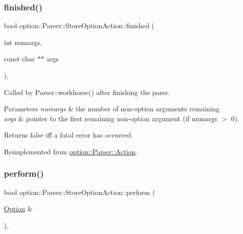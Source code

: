 \subsubsection{\texorpdfstring{finished()}{finished()}}
{\footnotesize\ttfamily bool option\+::\+Parser\+::\+Store\+Option\+Action\+::finished (\begin{DoxyParamCaption}\item[{int}]{numargs,  }\item[{const char $\ast$$\ast$}]{args }\end{DoxyParamCaption})\hspace{0.3cm}{\ttfamily [inline]}, {\ttfamily [virtual]}}



Called by Parser\+::workhorse() after finishing the parse. 


\begin{DoxyParams}{Parameters}
{\em numargs} & the number of non-\/option arguments remaining \\
\hline
{\em args} & pointer to the first remaining non-\/option argument (if numargs $>$ 0).\\
\hline
\end{DoxyParams}
\begin{DoxyReturn}{Returns}
{\ttfamily false} iff a fatal error has occurred. 
\end{DoxyReturn}


Reimplemented from \hyperlink{structoption_1_1_parser_1_1_action_a3ec558b51e34d33d116f14587289e032}{option\+::\+Parser\+::\+Action}.

\mbox{\label{classoption_1_1_parser_1_1_store_option_action_a8931919fba5516377c202920db2b2f84}} 
\subsubsection{\texorpdfstring{perform()}{perform()}}
{\footnotesize\ttfamily bool option\+::\+Parser\+::\+Store\+Option\+Action\+::perform (\begin{DoxyParamCaption}\item[{\hyperlink{classoption_1_1_option}{Option} \&}]{ }\end{DoxyParamCaption})\hspace{0.3cm}{\ttfamily [inline]}, {\ttfamily [virtual]}}



